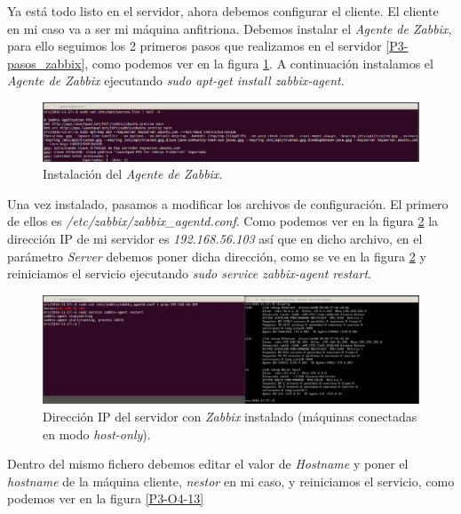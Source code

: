 \documentclass[a4paper,titlepage,12pt]{report}	%
\numberwithin{figure}{section} %
\numberwithin{table}{section} %
\begin{document}
	Ya está todo listo en el servidor, ahora debemos configurar el cliente. El cliente en mi caso va a ser mi máquina anfitriona. Debemos instalar el \textit{Agente de Zabbix}, para ello seguimos los 2 primeros pasos que realizamos en el servidor \ref{P3-pasos_zabbix}, como podemos ver en la figura \ref{P3-O4-11}. A continuación instalamos el \textit{Agente de Zabbix} ejecutando \textit{sudo apt-get install zabbix-agent}.

	\begin{figure}[H]
	   \includegraphics[width=\linewidth]{./Imagenes/P3/O4-11.png}
	   \vspace{-0.5cm}
	   \caption[Instalación del \textit{Agente de Zabbix}.]{Instalación del \textit{Agente de Zabbix}.}
	   \label{P3-O4-11}
	\end{figure}

	Una vez instalado, pasamos a modificar los archivos de configuración. El primero de ellos es \textit{/etc/zabbix/zabbix\_agentd.conf}. Como podemos ver en la figura \ref{P3-O4-12} la dirección IP de mi servidor es \textit{192.168.56.103} así que en dicho archivo, en el parámetro \textit{Server} debemos poner dicha dirección, como se ve en la figura \ref{P3-O4-12} y reiniciamos el servicio ejecutando \textit{sudo service zabbix-agent restart}.

	\begin{figure}[H]
	   \includegraphics[width=\linewidth]{./Imagenes/P3/O4-12.png}
	   \vspace{-0.5cm}
	   \caption[Dirección IP del servidor con \textit{Zabbix} instalado (máquinas conectadas en modo \textit{host-only}).]{Dirección IP del servidor con \textit{Zabbix} instalado (máquinas conectadas en modo \textit{host-only}).}
	   \label{P3-O4-12}
	\end{figure}

	Dentro del mismo fichero debemos editar el valor de \textit{Hostname} y poner el \textit{hostname} de la máquina cliente, \textit{nestor} en mi caso, y reiniciamos el servicio, como podemos ver en la figura \ref{P3-O4-13}
\end{document}
